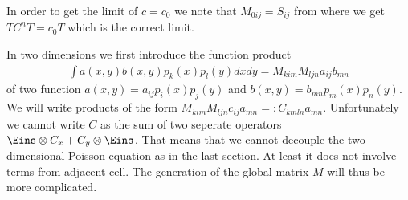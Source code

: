 \documentclass[a4paper,12pt]{scrartcl}
\begin{document}
In order to get the limit of $c = c_0$ we note that $M_{0ij} = S_{ij}$ from where
we get $TC^nT = c_0T$ which is the correct limit.


In two dimensions we first introduce the function product 
\begin{align}
    \int a(x,y)b(x,y) p_k(x)p_l(y) dxdy = M_{kim}M_{ljn}a_{ij}b_{mn}
    \label{}
\end{align}
of two function $a(x,y) = a_{ij}p_i(x)p_j(y)$ and $b(x,y) = b_{mn}p_m(x)p_n(y)$.
We will write products of the form $M_{kim}M_{ljn}c_{ij}a_{mn} =: C_{kmln}a_{mn}$. 
Unfortunately we cannot write $C$ as the sum of two seperate operators
$\Eins\otimes C_x + C_y\otimes \Eins$. That means that we cannot decouple the
two-dimensional Poisson equation as in the last section. At least it does not
involve terms from adjacent cell. The generation of the global matrix $M$ will
thus be more complicated.
\end{document}
